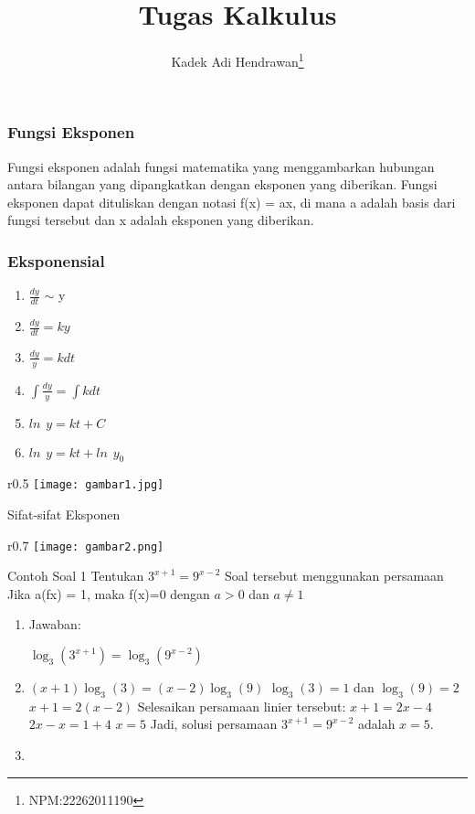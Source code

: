\documentclass{beamer}
\title{Tugas Kalkulus}
\institute{STTB}
\author{Kadek Adi Hendrawan\thanks{NPM:22262011190}}
\begin{document}
\begin{frame}
\titlepage
\end{frame}

\begin{frame}
\frametitle{Fungsi Eksponen}
Fungsi eksponen adalah fungsi matematika yang menggambarkan hubungan antara bilangan yang dipangkatkan dengan eksponen yang diberikan. Fungsi eksponen dapat dituliskan dengan notasi f(x) = ax, di mana a adalah basis dari fungsi tersebut dan x adalah eksponen yang diberikan.


\end{frame}

\begin{frame}
\frametitle{Eksponensial}
\begin{enumerate}
    \item[]
$ \frac{dy}{dt} $ $ \sim$ y
    \item[]
$ \frac{dy}{dt} =ky$
    \item[] 
$ \frac{dy}{y} =k dt$
    \item[] 
$ \int \frac{dy}{y} =\int k dt$
    \item[]
$ ln \hspace{5pt} y =kt+C$
    \item[] 
$ ln \hspace{5pt} y =kt+ln \hspace{5pt} y_0$
\end{enumerate}
\begin{wrapfigure}{r}{0.5\textwidth} 
  \centering
  \texttt{[image: gambar1.jpg]}
  \label{fig:contoh gambar 1}
\end{wrapfigure}
\end{frame}
\begin{frame}{Sifat-sifat Eksponen}
    \begin{wrapfigure}{r}{0.7\textwidth}
  \centering
  \texttt{[image: gambar2.png]}
  \label{fig:contoh gambar 2}
\end{wrapfigure}
\end{frame}

\begin{frame}{Contoh Soal 1}
Tentukan $3^{x+1} = 9^{x-2}$
Soal tersebut menggunakan persamaan Jika a(fx) = 1, maka f(x)=0 dengan $a > 0$ dan $a \neq 1$
\vspace{20pt}
\begin{enumerate}
    \item[]
\begin{tex}
    Jawaban:
\end{tex}
$\log_3(3^{x+1}) = \log_3(9^{x-2})$
    \item[]
\hspace{55pt}$(x+1) \log_3(3) = (x-2) \log_3(9)$
$\log_3(3) = 1$ dan $\log_3(9) = 2$
$x+1 = 2(x-2)$
Selesaikan persamaan linier tersebut:
$x+1 = 2x-4$
$2x - x = 1 + 4$
$x = 5$
Jadi, solusi persamaan $3^{x+1} = 9^{x-2}$ adalah $x = 5$.
    \item[]
\end{enumerate}
\end{frame}
\end{document}
